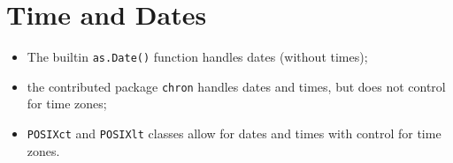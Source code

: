 \section{Time and Dates}
\begin{itemize}\item The builtin
\texttt{as.Date()} function handles dates (without times);\item the contributed package
\texttt{chron} handles dates and times, but does not control for time zones; \item
\texttt{POSIXct} and \texttt{POSIXlt} classes allow for dates and times with control for time
zones.
\end{itemize}
